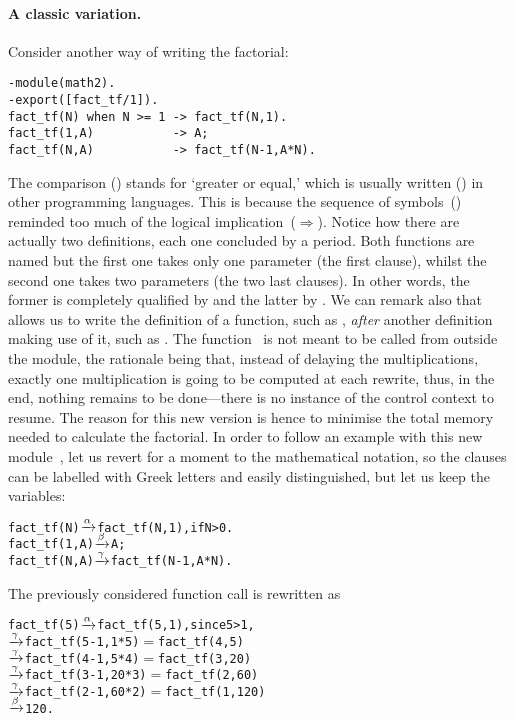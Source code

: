 \bigskip

\paragraph{A classic variation.}

Consider another way of writing the factorial:
\begin{verbatim}
-module(math2).
-export([fact_tf/1]).
fact_tf(N) when N >= 1 -> fact_tf(N,1).
fact_tf(1,A)           -> A;
fact_tf(N,A)           -> fact_tf(N-1,A*N).
\end{verbatim}
\noindent The \Erlang comparison (\erlcode{>=}) stands for `greater
or equal,' which is usually written (\erlcode{=>}) in other
programming languages. This is because the sequence of
symbols~(\erlcode{=>}) reminded too much of the logical
implication~(\(\Rightarrow\)). Notice how there are actually two
definitions, each one concluded by a period. Both functions are named
 but the first one takes only one parameter (the
first clause), whilst the second one takes two parameters (the two
last clauses). In other words, the former is completely qualified by
 and the latter by . We can
remark also that \Erlang allows us to write the definition of a
function, such as , \emph{after} another
definition making use of it, such as . The
function~ is not meant to be called from outside
the module, the rationale being that, instead of delaying the
multiplications, exactly one multiplication is going to be computed at
each rewrite, thus, in the end, nothing remains to be done---there is
no instance of the control context to resume. The reason for this new
version is hence to minimise the total memory needed to calculate the
factorial. In order to follow an example with this new
module~, let us revert for a moment to the mathematical
notation, so the clauses can be labelled with Greek letters and easily
distinguished, but let us keep the \Erlang variables:
\begin{alltt}
fact_tf(N)   \(\xrightarrow{\smash[t]{\alpha}}\) fact_tf(N,1),      \textrm{if} N > 0.
fact_tf(1,A) \(\xrightarrow{\smash[t]{\beta}}\) A;
fact_tf(N,A) \(\xrightarrow{\smash[t]{\gamma}}\) fact_tf(N-1,A*N).
\end{alltt}
The previously considered function call  is
rewritten as
\begin{alltt}
fact_tf(5) \(\xrightarrow{\smash[t]{\alpha}}\) fact_tf(5,1)\textrm{,}        \textrm{since} 5 > 1\textrm{,}
           \(\xrightarrow{\smash[t]{\gamma}}\) fact_tf(5-1,1*5)  \(=\) fact_tf(4,5)
           \(\xrightarrow{\smash[t]{\gamma}}\) fact_tf(4-1,5*4)  \(=\) fact_tf(3,20)
           \(\xrightarrow{\smash[t]{\gamma}}\) fact_tf(3-1,20*3) \(=\) fact_tf(2,60)
           \(\xrightarrow{\smash[t]{\gamma}}\) fact_tf(2-1,60*2) \(=\) fact_tf(1,120)
           \(\xrightarrow{\smash[t]{\beta}}\) 120\textrm{.}
\end{alltt}
